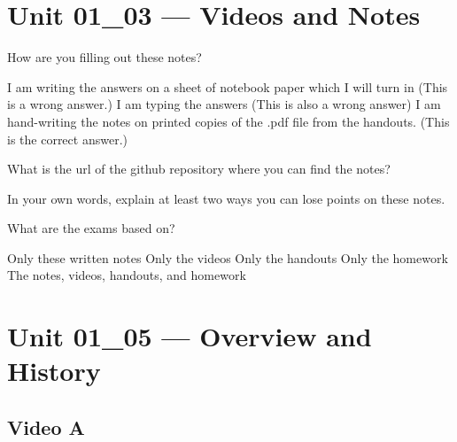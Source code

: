 \documentclass[letterpaper,12pt]{exam}
\begin{document}
\section*{Unit 01\_03 --- Videos and Notes} %

\begin{questions}
\question How are you filling out these notes?
\begin{checkboxes}
\choice I am writing the answers on a sheet of notebook paper which I will turn in (This is a wrong answer.)
\choice I am typing the answers (This is also a wrong answer)
\choice I am hand-writing the notes on printed copies of the .pdf file from the handouts. (This is the correct answer.)
\end{checkboxes}

\question What is the url of the github repository where you can find the notes? 
\vspace{.75cm}

\question In your own words, explain at least two ways you can lose points on these notes. 
\vspace{1.5cm}

\question What are the exams based on?
\begin{checkboxes}
\choice Only these written notes
\choice Only the videos
\choice Only the handouts
\choice Only the homework
\choice The notes, videos, handouts, and homework
\end{checkboxes}

\end{questions}
\section*{Unit 01\_05 --- Overview and History}
\subsection*{Video A}
\end{document}
